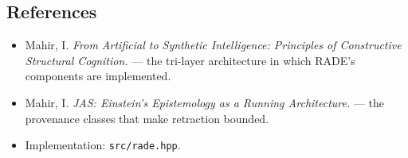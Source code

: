 \documentclass[
  11pt,
  a4paper,
]{article}
\providecommand{\tightlist}{%
  \setlength{\itemsep}{0pt}\setlength{\parskip}{0pt}}
\begin{document}
\subsection{References}\label{references}

\begin{itemize}
\tightlist
\item
  Mahir, I. \emph{From Artificial to Synthetic Intelligence: Principles
  of Constructive Structural Cognition.} --- the tri-layer architecture
  in which RADE's components are implemented.
\item
  Mahir, I. \emph{JAS: Einstein's Epistemology as a Running
  Architecture.} --- the provenance classes that make retraction
  bounded.
\item
  Implementation: \texttt{src/rade.hpp}.
\end{itemize}
\end{document}
